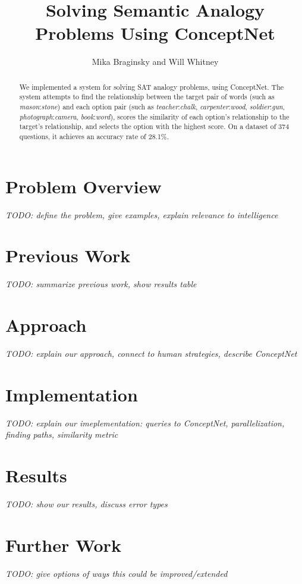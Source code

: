 \documentclass[11pt]{article}
\begin{document}
\title{Solving Semantic Analogy Problems Using ConceptNet}
\author{Mika Braginsky and Will Whitney}
\maketitle

\begin{abstract}
We implemented a system for solving SAT analogy problems, using ConceptNet. The system attempts to find the relationship between the target pair of words (such as \emph{mason}:\emph{stone}) and each option pair (such as \emph{teacher}:\emph{chalk}, \emph{carpenter}:\emph{wood}, \emph{soldier}:\emph{gun}, \emph{photograph}:\emph{camera}, \emph{book}:\emph{word}), scores the similarity of each option's relationship to the target's relationship, and selects the option with the highest score. On a dataset of 374 questions, it achieves an accuracy rate of 28.1\%.
\end{abstract}

\section{Problem Overview}
\textit{TODO: define the problem, give examples, explain relevance to intelligence}

\section{Previous Work}
\textit{TODO: summarize previous work, show results table}

\section{Approach}
\textit{TODO: explain our approach, connect to human strategies, describe ConceptNet}

\section{Implementation}
\textit{TODO: explain our imeplementation: queries to ConceptNet, parallelization, finding paths, similarity metric}

\section{Results}
\textit{TODO: show our results, discuss error types}

\section{Further Work}
\textit{TODO: give options of ways this could be improved/extended}
\end{document}
